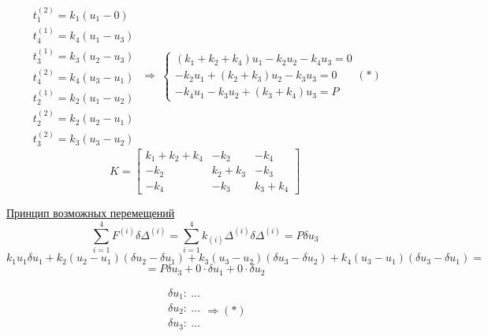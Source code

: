 \documentclass{bmstu}
\begin{document}
\[ \begin{matrix}
t_1^{(2)}=k_1(u_1-0) \\ t_4^{(1)} = k_4(u_1-u_3) \\ t_3^{(1)} = k_3(u_2-u_3) \\ t_4^{(2)}=k_4(u_3-u_1) \\ t_2^{(1)} = k_2(u_1-u_2) \\ t_2^{(2)} = k_2(u_2-u_1) \\ t_3^{(2)} = k_3(u_3-u_2)
\end{matrix} \ \Rightarrow \ \begin{cases}
(k_1+k_2+k_4)u_1-k_2u_2-k_4u_3=0 \\ -k_2u_1 + (k_2+k_3)u_2-k_3u_3=0 \\ -k_4u_1-k_3u_2+ (k_3+k_4)u_3=P
\end{cases} (\ast)
\]
\[
K=\begin{bmatrix}
	k_1+k_2+k_4 & -k_2 & -k_4 \\
	-k_2 & k_2+k_3 & -k_3 \\
	-k_4 & -k_3 & k_3+k_4
\end{bmatrix}
\]



\underline{Принцип возможных перемещений}
\[
\sum_{i=1}^4 F^{(i)}\delta\Delta^{(i)}= \sum_{i=1}^4 k_{(i)}\Delta^{(i)}\delta\Delta^{(i)}=P\delta u_3
\]
\[
k_1u_1\delta u_1 +k_2(u_2-u_1)(\delta u_2-\delta u_1)+k_3(u_3-u_2)(\delta u_3-\delta u_2)+k_4(u_3-u_1)(\delta u_3-\delta u_1)= \]
\[ = P\delta u_3 + 0\cdot \delta u_1+0\cdot \delta u_2
\]

\[
\begin{matrix}
	 \delta u_1: \ \dotsc \\
	 \delta u_2: \ \dotsc \\
	 \delta u_3: \ \dotsc \\
\end{matrix} \Rightarrow (\ast)
\]
\end{document}
